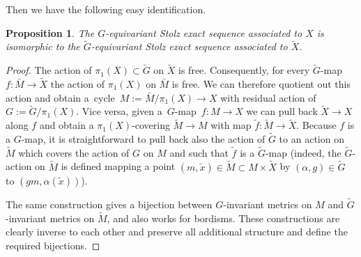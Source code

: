 \documentclass[11pt]{article}
\numberwithin{equation}{section}
\numberwithin{equation}{section}
\newtheorem{Proposition}[Theorem]{Proposition}
{ \theoremstyle{definition}
	\newtheorem{Definition}[Theorem]{Definition}
	\newtheorem{Note}[Theorem]{Note}
	\newtheorem{Example}[Theorem]{Example}
	\newtheorem{Remark}[Theorem]{Remark} }
\begin{document}
	
	Then we have the following easy identification.
	\begin{Proposition}\label{extension}
		The $G$-equivariant Stolz exact sequence associated to $X$ is isomorphic to
		the $\widetilde{G}$-equivariant Stolz exact sequence associated to
		$\tilde{X}$.
	\end{Proposition}
	\begin{proof}
		The action of $\pi_1(X)\subset \widetilde{G}$ on $\tilde X$ is
		free. Consequently, for every $\widetilde{G}$-map ${f\colon \bar M\to\tilde X}$ the
		action of $\pi_1(X)$ on $\bar M$ is free. We can therefore quotient out this
		action and obtain a~cycle~${M:=\bar M/\pi_1(X)\to X}$ with residual action of
		$G:=\widetilde{G}/\pi_1(X)$.
		Vice versa, given a~$G$-map~${f\colon M\to X}$ we can pull back $\tilde X\to
		X$ along $f$ and obtain a $\pi_1(X)$-covering $\tilde M\to M$ with map
		$\tilde f\colon \tilde M\to \tilde X$. Because $f$ is a $G$-map, it is
		straightforward to pull back
		also the action of $\widetilde{G}$ to an action on $\tilde M$ which covers
		the action of $G$ on $M$ and such that $\tilde f$ is a $\widetilde{G}$-map
		(indeed, the $\widetilde{G}$-action on $\tilde M$ is defined mapping a point
		$(m,\tilde x)\in \tilde M\subset M\times \tilde X$ by
		$(\alpha,g)\in\widetilde{G}$ to $(gm,\alpha(\tilde x))$).
		
		The same construction gives a bijection between $G$-invariant metrics on $M$
		and $\widetilde{G}$-invariant metrics on $\tilde M$, and also works for
		bordisms.
		These constructions are clearly inverse to each other and preserve all
		additional structure and define the required bijections.
	\end{proof}
	
\end{document}
